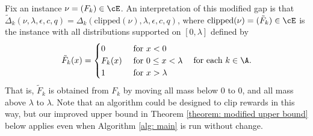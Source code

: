 \begin{remark}
    Fix an instance $\nu = (F_k) \in \cE$.
     An interpretation of this modified gap is that
    $\tilde{\Delta}_{k}(\nu, \lambda, \epsilon, c, q) =
    \Delta_{k}(\mathrm{clipped}(\nu), \lambda, \epsilon, c, q)$,
    where $\mathrm{clipped}(\nu) = (\tilde{F}_k) \in \cE$
    is the instance with all distributions supported on $[0, \lambda]$ defined by
    \begin{equation}
        \tilde{F}_k(x)  =
    \begin{cases}
        0 & \text{ for } x < 0 \\
        F_k(x) & \text{ for } 0 \le x < \lambda \\
        1 & \text{ for } x > \lambda 
    \end{cases}
    \quad 
    \text{for each } k \in \A.
    \end{equation}
    That is, $\tilde{F}_k$ is obtained from $F_k$ by moving all mass below 0 to 0, and all mass above $\lambda$ to $\lambda$.  Note that an algorithm could be designed to clip rewards in this way, but our improved upper bound in Theorem \ref{theorem: modified upper bound} below applies even when Algorithm \ref{alg: main} is run without change.
\end{remark}

